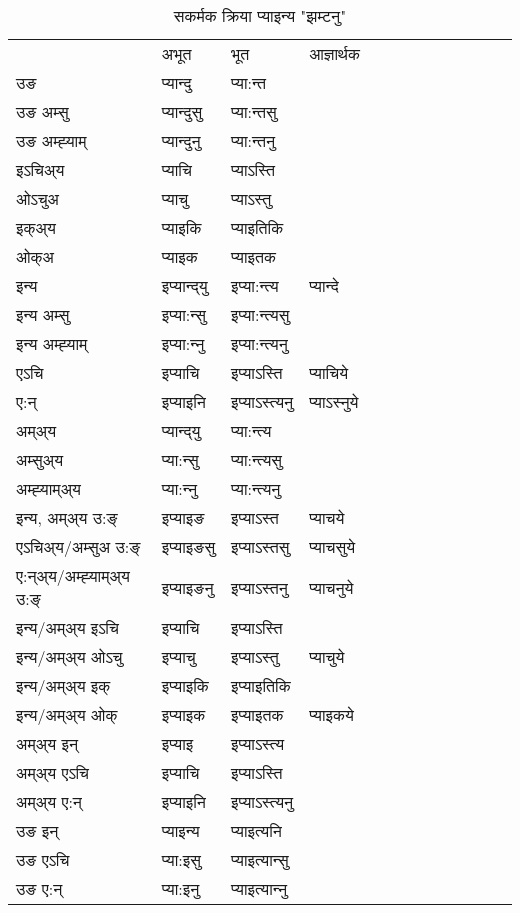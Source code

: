 \begin{table}[H]
\label{ɛnt.vt} \centering
\caption{सकर्मक क्रिया  प्याइन्य  "झम्टनु"  }
\begin{tabular}{l|l|l|l|l|l|l|l|l|l|l|l|l}  \toprule
&अभूत & भूत & आज्ञार्थक \\ 
उङ &प्यान्दु &प्या:न्त \\ 
उङ अम्सु&प्यान्दुसु &प्या:न्तसु \\ 
उङ अम्ह्‍याम्&प्यान्दुनु &प्या:न्तनु \\ 
इऽचिअ्य &प्याचि &प्याऽस्ति   \\ 
ओऽचुअ        &प्याचु &प्याऽस्तु   \\ 
इक्अ्य&प्याइकि &प्याइतिकि   \\ 
ओक्अ &प्याइक &प्याइतक   \\ 
इन्य & इप्यान्द्‌यु  & इप्या:न्त्य &प्यान्दे  \\ 
इन्य अम्सु& इप्या:न्सु  & इप्या:न्त्यसु   \\ 
इन्य अम्ह्‍याम्& इप्या:न्‍नु  & इप्या:न्त्यनु   \\ 
एऽचि & इप्याचि & इप्याऽस्ति &प्याचिये    \\ 
ए:न् & इप्याइनि  & इप्याऽस्त्यनु &प्याऽस्‍नुये  \\ 
अम्अ्य & प्यान्द्‌यु  & प्या:न्त्य  \\ 
अम्सुअ्य & प्या:न्सु & प्या:न्त्यसु  \\ 
अम्ह्‍याम्अ्य & प्या:न्‍नु  & प्या:न्त्यनु \\ 
\midrule
इन्य, अम्अ्य उ:ङ्‌ &इप्याइङ &इप्याऽस्त &प्याचये \\ 
एऽचिअ्य/अम्सुअ उ:ङ्‌ &इप्याइङसु &इप्याऽस्तसु &प्याचसुये \\ 
ए:न्अ्य/अम्ह्‍याम्अ्य उ:ङ्‌ &इप्याइङनु &इप्याऽस्तनु &प्याचनुये \\ 
इन्य/अम्अ्य इऽचि &इप्याचि &इप्याऽस्ति    \\ 
इन्य/अम्अ्य ओऽचु &इप्याचु &इप्याऽस्तु  &प्याचुये  \\ 
इन्य/अम्अ्य इक् &इप्याइकि &इप्याइतिकि   \\ 
इन्य/अम्अ्य ओक् &इप्याइक &इप्याइतक  &प्याइकये  \\ 
अम्अ्य इन् & इप्याइ & इप्याऽस्त्य   \\ 
अम्अ्य एऽचि & इप्याचि & इप्याऽस्ति    \\ 
अम्अ्य ए:न् & इप्याइनि  & इप्याऽस्त्यनु  \\ 
\midrule
उङ इन् & प्याइन्य  & प्याइत्यनि  \\ 
उङ एऽचि & प्या:इसु  & प्याइत्यान्सु   \\ 
उङ ए:न्& प्या:इनु  & प्याइत्यान्‍नु   \\ 
\bottomrule
\end{tabular}
\end{table}


